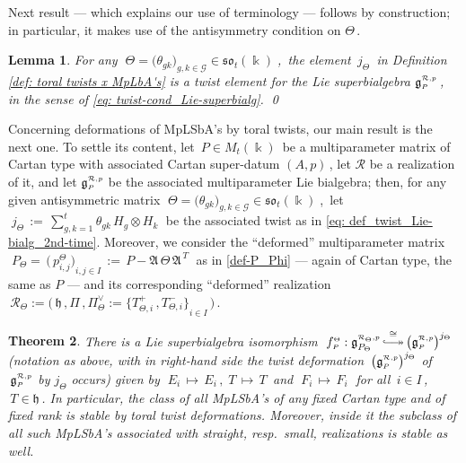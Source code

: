 \documentclass[12pt,reqno,twoside,a4paper]{amsart}
\numberwithin{equation}{section}
\newtheorem{lema}{Lemma}[subsection]
\newtheorem{theorem}[lema]{Theorem}
\theoremstyle{definition}
\newtheorem{free text}[lema]{}
\theoremstyle{remark}
\newcommand{\R}{{\mathcal R}}
\newcommand{\G}{{\mathcal G}}
\def \G {\mathcal{G}}
\def \Ppicc {{\scriptscriptstyle P}}
\def \Rpicc {{\scriptscriptstyle \R}}
\def \Thetapicc {{\scriptscriptstyle \Theta}}
\def \lieg{\mathfrak{g}}
\def \liegRpP{\mathfrak{g}^{\raise1pt\hbox{$ \scriptscriptstyle \mathcal{R},p $}}_\Ppicc}
\def \lieh{\mathfrak{h}}
\def \lieso{\mathfrak{so}}
\theoremstyle{plain}
\begin{document}
\vskip7pt

   Next result   --- which explains our use of terminology ---   follows by construction;
   in particular, it makes use of the antisymmetry condition on  $ \Theta \, $.

\vskip11pt

\begin{lema}  \label{lemma: toral twist x MpLbA's}
%
 For any  $ \; \Theta = \big( \theta_{gk} \big)_{g, k \in \G} \in \lieso_t(\Bbbk) \; $,  \,the element  $ \, j_\Thetapicc \, $  in  Defini\-tion \ref{def: toral twists x MpLbA's}  is a  \textsl{twist\/}  element for the Lie superbialgebra  $ \liegRpP \, $,  \,in the sense of  \eqref{eq: twist-cond_Lie-superbialg}.   \qed
%
\end{lema}

\vskip9pt

   Concerning deformations of MpLSbA's by toral twists, our main result is the next one.
   To settle its content, let  $ \, P\in M_t(\Bbbk) \, $  be a multiparameter matrix of Cartan
   type with associated Cartan super-datum  $ (A,p) \, $,
   let  $ \R $  be a realization of it, and let  $ \liegRpP $
   be the associated multiparameter Lie bialgebra; then, for any given antisymmetric matrix
   $ \; \Theta = \big( \theta_{gk} \big)_{g, k \in \G} \in \lieso_t(\Bbbk) \; $,  \,let
%
 $ \; j_\Thetapicc \, := \, {\textstyle \sum\limits_{g,k=1}^t} \theta_{gk} \, H_g \otimes H_k \; $
%
 be the associated twist as in  \eqref{eq: def_twist_Lie-bialg_2nd-time}.
 Moreover, we consider the ``deformed'' multiparameter matrix
%
 $ \; P_\Thetapicc = \, {\big(\, p^\Thetapicc_{i,j} \big)}_{i, j \in I} \, := \,
 P - \mathfrak{A} \, \Theta \, \mathfrak{A}^{\,\scriptscriptstyle T} \; $
%
 as in  \eqref{def-P_Phi}   --- again of Cartan type, the same as  $ P $  ---
 and its corresponding ``deformed'' realization
%
 $ \, \R_\Thetapicc := \big(\, \lieh \, , \Pi \, , \Pi^\vee_\Thetapicc \! := {\big\{ T^+_{\Thetapicc,i} \, , T^-_{\Thetapicc,i} \big\}}_{i \in I} \,\big) \, $.

\vskip11pt

\begin{theorem}  \label{thm: twist-liegRP=new-liegR'P'}
 There is a Lie superbialgebra isomorphism
%
  $ \; f^\Thetapicc_{\Ppicc} : \lieg_{P_\Thetapicc}^{\scriptscriptstyle \Rpicc_\Thetapicc,p} \, {\buildrel \cong \over
 {\lhook\joinrel\relbar\joinrel\twoheadrightarrow}} \,
{\big( \liegRpP \big)}^{j_\Thetapicc} $
%
 \; (notation as above, with in right-hand side the twist deformation
 $ \, {\big( \liegRpP \big)}^{j_\Thetapicc} $  of  $ \, \liegRpP $
 by  $ j_\Thetapicc $  occurs) given by
%
  $ \; E_i \, \mapsto \, E_i \, , \; T \, \mapsto \, T \, $  and
  $ \; F_i \, \mapsto \, F_i \; $
%
 for all  $ \, i \in I \, $,  $ \, T \in \lieh \, $.
%
 \vskip3pt
%
   In particular, the class of all MpLSbA's of any fixed Cartan type and
   of fixed rank is stable by toral twist deformations.
   Moreover, inside it the subclass of all such MpLSbA's associated with
   \textsl{straight},  resp.\  \textsl{small},  realizations is stable as well.
%
\end{theorem}
\end{document}
